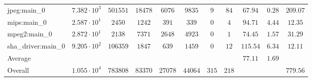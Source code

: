 \begin{tabular}{|l|c|c|c|c|c|c|c|c|c|c|}
jpeg:main\_0            & $ 7.382 \cdot 10^{3} $ & $ 501551 $ & $ 18478 $ & $ 6076  $ & $ 9835  $ & $ 9   $ & $ 84  $ & $ 67.94       $ & $ 0.28    $ & $ 209.07  $ \\
mips:main\_0            & $ 2.587 \cdot 10^{1} $ & $ 2450   $ & $ 1242  $ & $ 391   $ & $ 339   $ & $ 0   $ & $ 4   $ & $ 94.71       $ & $ 4.44    $ & $ 12.35   $ \\
mpeg2:main\_0           & $ 2.872 \cdot 10^{1} $ & $ 2138   $ & $ 7371  $ & $ 2648  $ & $ 4923  $ & $ 0   $ & $ 1   $ & $ 74.45       $ & $ 1.57    $ & $ 31.29   $ \\
sha\_driver:main\_0     & $ 9.205 \cdot 10^{2} $ & $ 106359 $ & $ 1847  $ & $ 639   $ & $ 1459  $ & $ 0   $ & $ 12  $ & $ 115.54      $ & $ 6.34    $ & $ 12.11   $ \\
\hline
Average                 & $                    $ & $        $ & $       $ & $       $ & $       $ & $     $ & $     $ & $ 77.11       $ & $ 1.69    $ & $         $ \\
\hline
Overall                 & $ 1.055 \cdot 10^{4} $ & $ 783808 $ & $ 83370 $ & $ 27078 $ & $ 44064 $ & $ 315 $ & $ 218 $ & $             $ & $         $ & $ 779.56  $ \\
\hline
\end{tabular}
